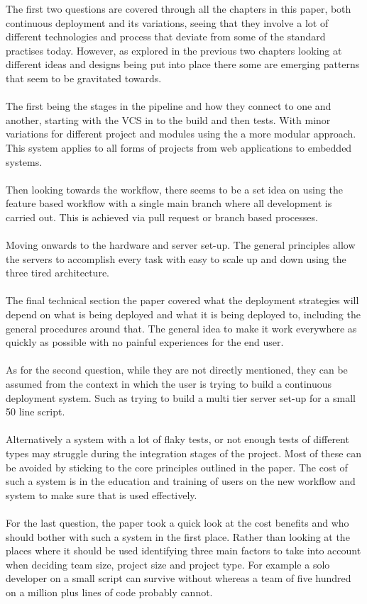 The first two questions are covered through all the chapters in this paper, both continuous deployment and its variations, seeing that they involve a lot of different technologies and process that deviate from some of the standard practises today. However, as explored in the previous two chapters looking at different ideas and designs being put into place there some are emerging patterns that seem to be gravitated towards.
\\\\
The first being the stages in the pipeline and how they connect to one and another, starting with the VCS in to the build and then tests. With minor variations for different project and modules using the a more modular approach. This system applies to all forms of projects from web applications to embedded systems.
\\\\
Then looking towards the workflow, there seems to be a set idea on using the feature based workflow with a single main branch where all development is carried out. This is achieved via pull request or branch based processes.
\\\\
Moving onwards to the hardware and server set-up. The general principles allow the servers to accomplish every task with easy to scale up and down using the three tired architecture.
\\\\
The final technical section the paper covered what the deployment strategies will depend on what is being deployed and what it is being deployed to, including the general procedures around that. The general idea to make it work everywhere as quickly as possible with no painful experiences for the end user.
\\\\
As for the second question, while they are not directly mentioned, they can be assumed from the context in which the user is trying to build a continuous deployment system. Such as trying to build a multi tier server set-up for a small 50 line script. 
\\\\
Alternatively a system with a lot of flaky tests, or not enough tests of different types may struggle during the integration stages of the project. Most of these can be avoided by sticking to the core principles outlined in the paper. The cost of such a system is in the education and training of users on the new workflow and system to make sure that is used effectively.
\\\\
For the last question, the paper took a quick look at the cost benefits and who should bother with such a system in the first place. Rather than looking at the places where it should be used identifying three main factors to take into account when deciding team size, project size and project type. For example a solo developer on a small script can survive without whereas a team of five hundred on  a million plus lines of code probably cannot.

